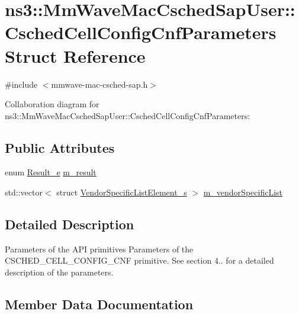 \hypertarget{structns3_1_1MmWaveMacCschedSapUser_1_1CschedCellConfigCnfParameters}{}\section{ns3\+:\+:Mm\+Wave\+Mac\+Csched\+Sap\+User\+:\+:Csched\+Cell\+Config\+Cnf\+Parameters Struct Reference}
\label{structns3_1_1MmWaveMacCschedSapUser_1_1CschedCellConfigCnfParameters}


{\ttfamily \#include $<$mmwave-\/mac-\/csched-\/sap.\+h$>$}



Collaboration diagram for ns3\+:\+:Mm\+Wave\+Mac\+Csched\+Sap\+User\+:\+:Csched\+Cell\+Config\+Cnf\+Parameters\+:
\subsection*{Public Attributes}
\begin{DoxyCompactItemize}
\item 
enum \hyperlink{namespacens3_a7acf2b7f9e0781dfe43a6bc54d6ecd07}{Result\+\_\+e} \hyperlink{structns3_1_1MmWaveMacCschedSapUser_1_1CschedCellConfigCnfParameters_a81720f7c439b29a6865d1817a8315e47}{m\+\_\+result}
\item 
std\+::vector$<$ struct \hyperlink{structns3_1_1VendorSpecificListElement__s}{Vendor\+Specific\+List\+Element\+\_\+s} $>$ \hyperlink{structns3_1_1MmWaveMacCschedSapUser_1_1CschedCellConfigCnfParameters_afd6e6641ab009bc7c150da472e34d936}{m\+\_\+vendor\+Specific\+List}
\end{DoxyCompactItemize}


\subsection{Detailed Description}
Parameters of the A\+PI primitives Parameters of the C\+S\+C\+H\+E\+D\+\_\+\+C\+E\+L\+L\+\_\+\+C\+O\+N\+F\+I\+G\+\_\+\+C\+NF primitive. See section 4.. for a detailed description of the parameters. 

\subsection{Member Data Documentation}
